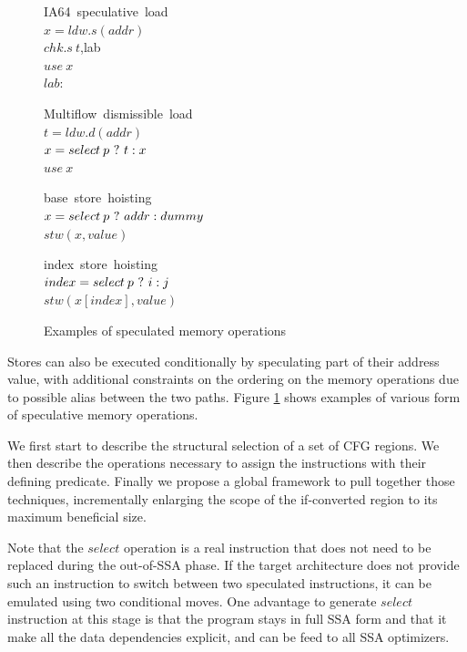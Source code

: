 \begin{figure}
\begin{minipage}[t]{4cm}
\mbox{IA64 speculative load} \\
$x = ldw.s(addr) $ \\
$chk.s\:t$,lab \\
$use\: x$ \\
$lab:$ \\

\end{minipage}
\begin{minipage}[t]{4cm}
\mbox{Multiflow dismissible load} \\
$t = ldw.d(addr) $ \\
$x = select\:p ~?~ t : x $ \\
$use\:x$ \\
\end{minipage}

\begin{minipage}[t]{4cm}
\mbox{base store hoisting} \\
$x=select\:p ~?~ addr : dummy $ \\
$stw (x, value) $ \\
\end{minipage}
\begin{minipage}[t]{4cm}
\mbox{index store hoisting} \\
$index=select\:p ~?~ i : j $ \\
$stw (x[index], value) $ \\
\end{minipage}
\caption{Examples of speculated memory operations}
\label{fig:spec}
\end{figure}

Stores can also be executed conditionally by speculating part of their address value, with additional constraints on the ordering on the memory operations due to possible alias between the two paths. Figure \ref{fig:spec} shows examples of various form of speculative memory operations.

We first start to describe the structural selection of a set of CFG regions. We then describe the operations necessary to assign the instructions with their defining predicate. Finally we propose a global framework to pull together those techniques, incrementally enlarging the scope of the if-converted region to its maximum beneficial size.

Note that the $select$ operation is a real instruction that does not need to be replaced during the out-of-SSA phase. If the target architecture does not provide such an instruction to switch between two speculated instructions, it can be emulated using two conditional moves. One advantage to generate $select$ instruction at this stage is that the program stays in full SSA form and that it make all the data dependencies explicit, and can be feed to all SSA optimizers. 


